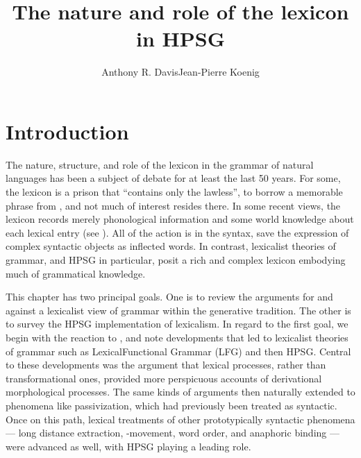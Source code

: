 \documentclass[output=paper,biblatex,babelshorthands,newtxmath,draftmode,colorlinks,citecolor=brown]{langscibook}
\author{Anthony R. Davis\affiliation{Southern Oregon University}\lastand Jean-Pierre Koenig\affiliation{University at Buffalo}}
\title{The nature and role of the lexicon in HPSG}
\begin{document}
\maketitle
\label{chap-lexicon}

\section{Introduction}

The nature, structure, and role of the lexicon in the grammar of natural languages has been a
subject of debate for at least the last 50 years. For some, the lexicon is a prison that ``contains
only the lawless'', to borrow a memorable phrase from , and not
much of interest resides there. In some recent views, the lexicon records merely phonological
information and some world knowledge about each lexical entry (see \citealt{Marantz1997}). All of
the action is in the syntax, save the expression of complex syntactic objects as inflected words.
In contrast, lexicalist theories of grammar, and HPSG in particular, posit a rich and complex
lexicon embodying much of grammatical knowledge.

This chapter has two principal goals.  One is to review the arguments for and against a lexicalist
view of grammar within the generative tradition.  The other is to survey the HPSG implementation of
lexicalism. In regard to the first goal, we begin with the reaction to ,
and note developments that led to lexicalist theories of grammar such as Lexical\indexlfg Functional
Grammar (LFG) and then HPSG.  Central to these developments was the argument that lexical processes,
rather than transformational ones, provided more perspicuous accounts of derivational morphological
processes.  The same kinds of arguments then naturally extended to phenomena like
passivization, which had previously been treated as syntactic.  Once on this path,
lexical treatments of other prototypically syntactic phenomena — long distance extraction,
-movement, word order, and anaphoric binding — were advanced as well, with HPSG playing a
leading role.
\end{document}
